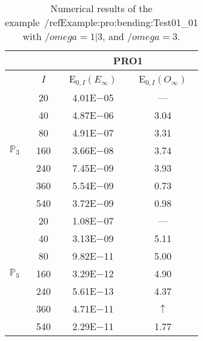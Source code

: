 \begin{table}[H]
\caption{Numerical results of the example~/ref{Example:pro:bending:Test01_01} with $/omega=1|3$, and $/omega=3$.}
\setlength{\tabcolsep}{5pt}
\centering
\begin{tabular}{@{}l c c c@{}}
\toprule
 &  & \multicolumn{2}{c}{PRO1}\\
\midrule
 & $I$ & E$_{0,I}(E_{\infty})$ & E$_{0,I}(O_{\infty})$\\
\midrule
\multirow{7}{*}{$\mathbb{P}_{3}$}
 & 20 & 4.01E$-$05 & ---\\
 & 40 & 4.87E$-$06 & 3.04\\
 & 80 & 4.91E$-$07 & 3.31\\
 & 160 & 3.66E$-$08 & 3.74\\
 & 240 & 7.45E$-$09 & 3.93\\
 & 360 & 5.54E$-$09 & 0.73\\
 & 540 & 3.72E$-$09 & 0.98\\
\midrule
\multirow{7}{*}{$\mathbb{P}_{5}$}
 & 20 & 1.08E$-$07 & ---\\
 & 40 & 3.13E$-$09 & 5.11\\
 & 80 & 9.82E$-$11 & 5.00\\
 & 160 & 3.29E$-$12 & 4.90\\
 & 240 & 5.61E$-$13 & 4.37\\
 & 360 & 4.71E$-$11 & $\uparrow$\\
 & 540 & 2.29E$-$11 & 1.77\\
\bottomrule
\end{tabular}
\label{Table:pRO:test_01_01_test7_pro3}
\end{table}
